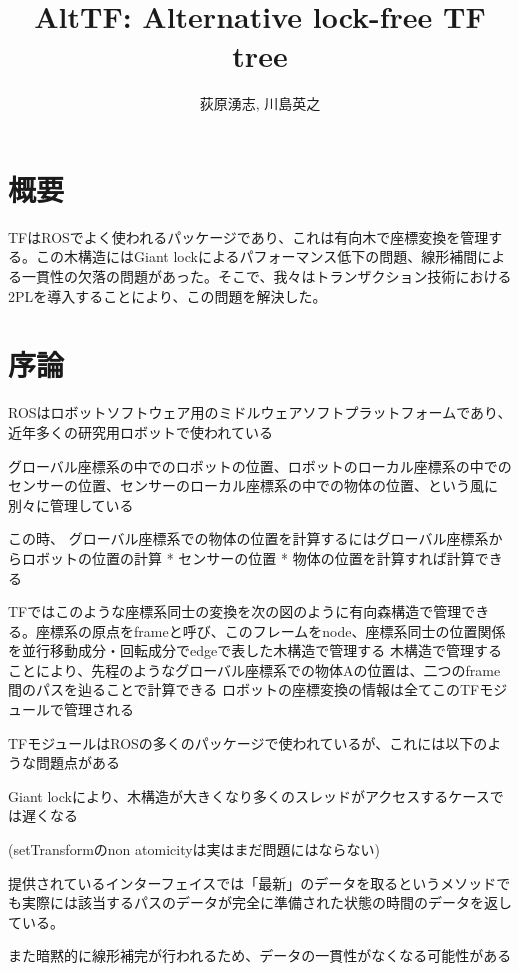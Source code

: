 \documentclass{article}
\title{AltTF: Alternative lock-free TF tree}
\author{荻原湧志, 川島英之}
\begin{document}
\begin{multicols}{2}

\maketitle

\section*{概要}
TFはROSでよく使われるパッケージであり、これは有向木で座標変換を管理する。この木構造にはGiant lockによるパフォーマンス低下の問題、線形補間による一貫性の欠落の問題があった。そこで、我々はトランザクション技術における2PLを導入することにより、この問題を解決した。

\section{序論}


ROSはロボットソフトウェア用のミドルウェアソフトプラットフォームであり、近年多くの研究用ロボットで使われている

グローバル座標系の中でのロボットの位置、ロボットのローカル座標系の中でのセンサーの位置、センサーのローカル座標系の中での物体の位置、という風に別々に管理している

この時、
グローバル座標系での物体の位置を計算するにはグローバル座標系からロボットの位置の計算 * センサーの位置 * 物体の位置を計算すれば計算できる

TFではこのような座標系同士の変換を次の図のように有向森構造で管理できる。座標系の原点をframeと呼び、このフレームをnode、座標系同士の位置関係を並行移動成分・回転成分でedgeで表した木構造で管理する
木構造で管理することにより、先程のようなグローバル座標系での物体Aの位置は、二つのframe間のパスを辿ることで計算できる
ロボットの座標変換の情報は全てこのTFモジュールで管理される

TFモジュールはROSの多くのパッケージで使われているが、これには以下のような問題点がある

Giant lockにより、木構造が大きくなり多くのスレッドがアクセスするケースでは遅くなる

(setTransformのnon atomicityは実はまだ問題にはならない)

提供されているインターフェイスでは「最新」のデータを取るというメソッドでも実際には該当するパスのデータが完全に準備された状態の時間のデータを返している。

また暗黙的に線形補完が行われるため、データの一貫性がなくなる可能性がある






\end{multicols}
\end{document}
